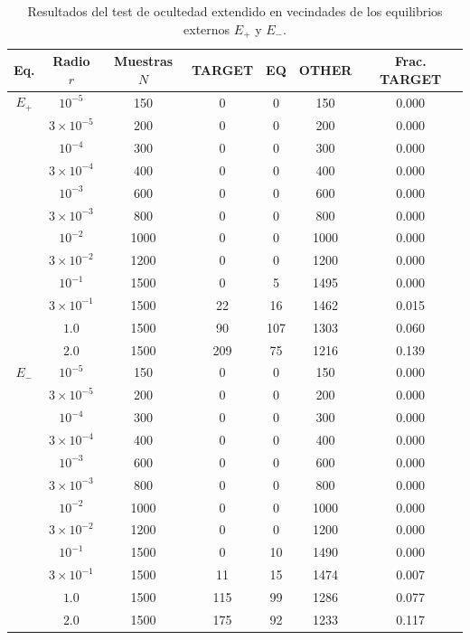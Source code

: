 \begin{table}[H]
\centering
\scriptsize
\caption{Resultados del test de ocultedad extendido en vecindades de los equilibrios externos $E_+$ y $E_-$.}
\label{tab:chua_frac_ns_biased_extended_hiddenness}
\begin{tabular}{ccccccc}
\toprule
\textbf{Eq.} & \textbf{Radio} $r$ & \textbf{Muestras} $N$ & \textbf{TARGET} & \textbf{EQ} & \textbf{OTHER} & \textbf{Frac. TARGET} \\
\midrule
$E_+$ & $10^{-5}$ & 150 & 0 & 0 & 150 & 0.000 \\
      & $3{\times}10^{-5}$ & 200 & 0 & 0 & 200 & 0.000 \\
      & $10^{-4}$ & 300 & 0 & 0 & 300 & 0.000 \\
      & $3{\times}10^{-4}$ & 400 & 0 & 0 & 400 & 0.000 \\
      & $10^{-3}$ & 600 & 0 & 0 & 600 & 0.000 \\
      & $3{\times}10^{-3}$ & 800 & 0 & 0 & 800 & 0.000 \\
      & $10^{-2}$ & 1000 & 0 & 0 & 1000 & 0.000 \\
      & $3{\times}10^{-2}$ & 1200 & 0 & 0 & 1200 & 0.000 \\
      & $10^{-1}$ & 1500 & 0 & 5 & 1495 & 0.000 \\
      & $3{\times}10^{-1}$ & 1500 & 22 & 16 & 1462 & 0.015 \\
      & $1.0$ & 1500 & 90 & 107 & 1303 & 0.060 \\
      & $2.0$ & 1500 & 209 & 75 & 1216 & 0.139 \\
\midrule
$E_-$ & $10^{-5}$ & 150 & 0 & 0 & 150 & 0.000 \\
      & $3{\times}10^{-5}$ & 200 & 0 & 0 & 200 & 0.000 \\
      & $10^{-4}$ & 300 & 0 & 0 & 300 & 0.000 \\
      & $3{\times}10^{-4}$ & 400 & 0 & 0 & 400 & 0.000 \\
      & $10^{-3}$ & 600 & 0 & 0 & 600 & 0.000 \\
      & $3{\times}10^{-3}$ & 800 & 0 & 0 & 800 & 0.000 \\
      & $10^{-2}$ & 1000 & 0 & 0 & 1000 & 0.000 \\
      & $3{\times}10^{-2}$ & 1200 & 0 & 0 & 1200 & 0.000 \\
      & $10^{-1}$ & 1500 & 0 & 10 & 1490 & 0.000 \\
      & $3{\times}10^{-1}$ & 1500 & 11 & 15 & 1474 & 0.007 \\
      & $1.0$ & 1500 & 115 & 99 & 1286 & 0.077 \\
      & $2.0$ & 1500 & 175 & 92 & 1233 & 0.117 \\
\bottomrule
\end{tabular}
\end{table}

